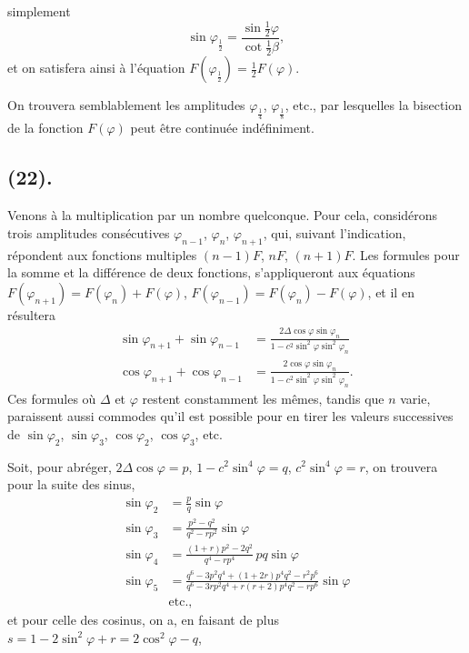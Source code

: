 \documentclass{article}
\begin{document}
simplement
\[ \sin\varphi_{\frac{1}{2}}=\frac{\sin\frac{1}{2}\varphi}{\cot\frac{1}{2}\beta}, \]
 et on satisfera ainsi à l'équation $F(\varphi_{\frac{1}{2}})=\frac{1}{2}F(\varphi)$.

On trouvera semblablement les amplitudes $\varphi_{\frac{1}{4}}$, $\varphi_{\frac{1}{8}}$, etc., par lesquelles la bisection de la fonction $F(\varphi)$ peut être continuée indéfiniment.

\subsection*{(22).}

Venons à la multiplication par un nombre quelconque. Pour cela, considérons trois amplitudes consécutives $\varphi_{n-1}$, $\varphi_{n}$, $\varphi_{n+1}$, qui, suivant l'indication, répondent aux fonctions multiples $(n-1)F$, $nF$, $(n+1)F$. Les formules pour la somme et la différence de deux fonctions, s'appliqueront aux équations $F(\varphi_{n+1})=F(\varphi_{n})+F(\varphi)$, $F(\varphi_{n-1})=F(\varphi_{n})-F(\varphi)$, et il en résultera
\[ \begin{aligned} \sin\varphi_{n+1}+\sin\varphi_{n-1} &= \frac{2\Delta\cos\varphi\sin\varphi_{n}}{1-c^{2}\sin^{2}\varphi\sin^{2}\varphi_{n}} \\ \cos\varphi_{n+1}+\cos\varphi_{n-1} &= \frac{2\cos\varphi\sin\varphi_{n}}{1-c^{2}\sin^{2}\varphi\sin^{2}\varphi_{n}}. \end{aligned} \]
 Ces formules où $\Delta$ et $\varphi$ restent constamment les mêmes, tandis que $n$ varie, paraissent aussi commodes qu'il est possible pour en tirer les valeurs successives de $\sin\varphi_{2}$, $\sin\varphi_{3}$, $\cos\varphi_{2}$, $\cos\varphi_{3}$, etc.

Soit, pour abréger, $2\Delta\cos\varphi=p$, $1-c^{2}\sin^{4}\varphi=q$, $c^{2}\sin^{4}\varphi=r$, on trouvera pour la suite des sinus,
\[ \begin{aligned} \sin\varphi_{2} &= \frac{p}{q}\sin\varphi \\ \sin\varphi_{3} &= \frac{p^{2}-q^{2}}{q^{2}-rp^{2}}\sin\varphi \\ \sin\varphi_{4} &= \frac{(1+r)p^{2}-2q^{2}}{q^{4}-rp^{4}}\,pq\sin\varphi \\ \sin\varphi_{5} &= \frac{q^{6}-3p^{2}q^{4}+(1+2r)p^{4}q^{2}-r^{2}p^{6}}{q^{6}-3rp^{2}q^{4}+r(r+2)p^{4}q^{2}-rp^{6}}\sin\varphi \\ &\text{etc.}, \end{aligned} \]
et pour celle des cosinus, on a, en faisant de plus $s=1-2\sin^{2}\varphi+r=2\cos^{2}\varphi-q$,
\end{document}
